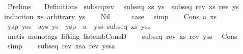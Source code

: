 %
\begin{isabellebody}%
%
%
\isadelimtheory
%
\endisadelimtheory
%
\isatagtheory
{}\isamarkupfalse%
\ Prelims\isanewline
\ \ \ Definitions\isanewline
\isanewline
{}%
\endisatagtheory
{\isafoldtheory}%
%
\isadelimtheory
\isanewline
%
\endisadelimtheory
\isanewline
{}\isamarkupfalse%
\ subseq{\isacharunderscore}{\kern0pt}rev{\isacharcolon}{\kern0pt}\isanewline
\ \ {\isachardoublequoteopen}subseq\ xs\ ys\ {\isasymLongrightarrow}\ subseq\ {\isacharparenleft}{\kern0pt}rev\ xs{\isacharparenright}{\kern0pt}\ {\isacharparenleft}{\kern0pt}rev\ ys{\isacharparenright}{\kern0pt}{\isachardoublequoteclose}\isanewline
%
\isadelimproof
%
\endisadelimproof
%
\isatagproof
{}\isamarkupfalse%
{\isacharparenleft}{\kern0pt}induction\ xs\ arbitrary{\isacharcolon}{\kern0pt}\ ys{\isacharparenright}{\kern0pt}\isanewline
\ \ \isamarkupfalse%
\ Nil\isanewline
\ \ \isamarkupfalse%
\ \isamarkupfalse%
\ {\isacharquery}{\kern0pt}case\ \isamarkupfalse%
\ simp\isanewline
{}\isamarkupfalse%
\isanewline
\ \ \isamarkupfalse%
\ {\isacharparenleft}{\kern0pt}Cons\ a\ xs{\isacharparenright}{\kern0pt}\isanewline
\ \ \isamarkupfalse%
\ \isamarkupfalse%
\ ysp\ yss\ \ a{\isacharunderscore}{\kern0pt}ys{\isacharcolon}{\kern0pt}\ {\isachardoublequoteopen}ys\ {\isacharequal}{\kern0pt}\ ysp\ {\isacharat}{\kern0pt}\ a\ {\isacharhash}{\kern0pt}\ yss{\isachardoublequoteclose}\ {\isachardoublequoteopen}subseq\ xs\ yss{\isachardoublequoteclose}\isanewline
\ \ \ \ \isamarkupfalse%
\ {\isacharparenleft}{\kern0pt}metis\ {\isacharparenleft}{\kern0pt}mono{\isacharunderscore}{\kern0pt}tags{\isacharcomma}{\kern0pt}\ lifting{\isacharparenright}{\kern0pt}\ list{\isacharunderscore}{\kern0pt}emb{\isacharunderscore}{\kern0pt}ConsD{\isacharparenright}{\kern0pt}\isanewline
\ \ \isamarkupfalse%
\ {\isachardoublequoteopen}subseq\ {\isacharparenleft}{\kern0pt}rev\ xs{\isacharparenright}{\kern0pt}\ {\isacharparenleft}{\kern0pt}rev\ yss{\isacharparenright}{\kern0pt}{\isachardoublequoteclose}\ \isamarkupfalse%
\ Cons{\isacharparenleft}{\kern0pt}{}{\isacharparenright}{\kern0pt}\ \isamarkupfalse%
\ simp\isanewline
\ \ \isamarkupfalse%
\ {\isachardoublequoteopen}subseq\ {\isacharparenleft}{\kern0pt}{\isacharparenleft}{\kern0pt}rev\ xs{\isacharparenright}{\kern0pt}{\isacharat}{\kern0pt}{\isacharbrackleft}{\kern0pt}a{\isacharbrackright}{\kern0pt}{\isacharparenright}{\kern0pt}\ {\isacharparenleft}{\kern0pt}{\isacharparenleft}{\kern0pt}rev\ yss{\isacharparenright}{\kern0pt}{\isacharat}{\kern0pt}{\isacharbrackleft}{\kern0pt}a{\isacharbrackright}{\kern0pt}{\isacharparenright}{\kern0pt}{\isachardoublequoteclose}\ \isamarkupfalse%

\end{isabellebody}
